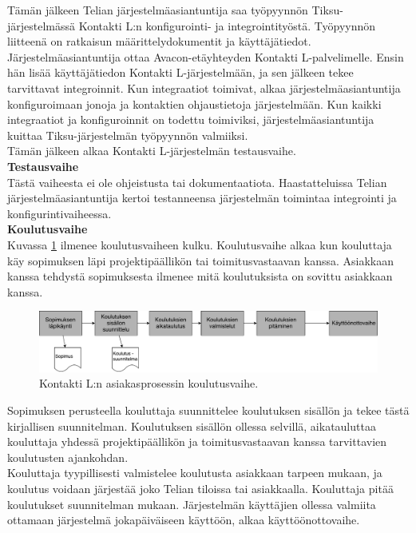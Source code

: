 \documentclass[finnish,12pt,a4paper,pdftex]{article}
\begin{document}
Tämän jälkeen Telian järjestelmäasiantuntija saa työpyynnön Tiksu-järjestelmässä Kontakti L:n konfigurointi- ja integrointityöstä. Työpyynnön liitteenä on ratkaisun määrittelydokumentit ja käyttäjätiedot. Järjestelmäasiantuntija ottaa Avacon-etäyhteyden Kontakti L-palvelimelle. Ensin hän lisää käyttäjätiedon Kontakti L-järjestelmään, ja sen jälkeen tekee tarvittavat integroinnit. Kun integraatiot toimivat, alkaa järjestelmäasiantuntija konfiguroimaan jonoja ja kontaktien ohjaustietoja järjestelmään. Kun kaikki integraatiot ja konfiguroinnit on todettu toimiviksi, järjestelmäasiantuntija kuittaa Tiksu-järjestelmän työpyynnön valmiiksi.\\

Tämän jälkeen alkaa Kontakti L-järjestelmän testausvaihe.\\

\textbf{Testausvaihe}\\

Tästä vaiheesta ei ole ohjeistusta tai dokumentaatiota. Haastatteluissa Telian järjestelmäasiantuntija kertoi testanneensa järjestelmän toimintaa integrointi ja konfigurintivaiheessa.\\

\textbf{Koulutusvaihe}\\

Kuvassa \ref{fig:koulutus} ilmenee koulutusvaiheen kulku. Koulutusvaihe alkaa kun kouluttaja käy sopimuksen läpi projektipäällikön tai toimitusvastaavan kanssa. Asiakkaan kanssa tehdystä sopimuksesta ilmenee mitä koulutuksista on sovittu asiakkaan kanssa.

\begin{figure}[!h]
    \centering
    \includegraphics[scale=0.3]{images/koulutukset.pdf}
    \caption{Kontakti L:n asiakasprosessin koulutusvaihe.}
    \label{fig:koulutus}
\end{figure}

Sopimuksen perusteella kouluttaja suunnittelee koulutuksen sisällön ja tekee tästä kirjallisen suunnitelman. Koulutuksen sisällön ollessa selvillä, aikatauluttaa kouluttaja yhdessä projektipäällikön ja toimitusvastaavan kanssa tarvittavien koulutusten ajankohdan.\\

Kouluttaja tyypillisesti valmistelee koulutusta asiakkaan tarpeen mukaan, ja koulutus voidaan järjestää joko Telian tiloissa tai asiakkaalla. Kouluttaja pitää koulutukset suunnitelman mukaan. Järjestelmän käyttäjien ollessa valmiita ottamaan järjestelmä jokapäiväiseen käyttöön, alkaa käyttöönottovaihe.\\
\end{document}
